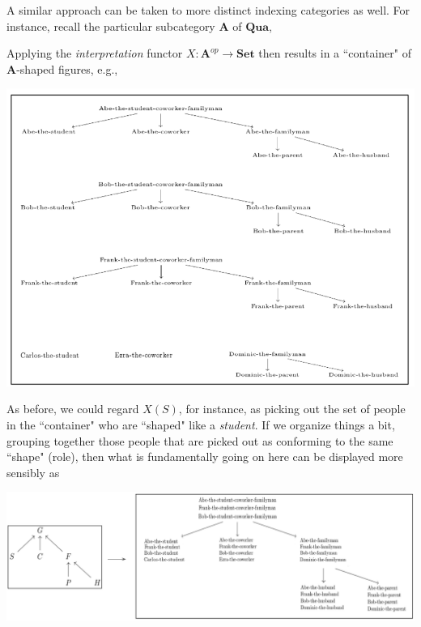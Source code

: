\documentclass[a4paper]{book}
\theoremstyle{definition}
\theoremstyle{definition}
\theoremstyle{definition}
\theoremstyle{theorem}
\theoremstyle{definition}
\begin{document}
A similar approach can be taken to more distinct indexing categories as well. For instance, recall the particular subcategory $\textbf{A}$ of $\textbf{Qua}$, 
	\begin{center}
\end{center}
Applying the \textit{interpretation} functor $X: \textbf{A}^{op} \rightarrow \textbf{Set}$ then results in a ``container" of $\textbf{A}$-shaped figures, e.g., 
\begin{center}
	\includegraphics*[scale=0.38]{LifePicture.png}
\end{center}
As before, we could regard $X(S)$, for instance, as picking out the set of people in the ``container" who are ``shaped" like a \textit{student}. If we organize things a bit, grouping together those people that are picked out as conforming to the same ``shape" (role), then what is fundamentally going on here can be displayed more sensibly as   
\begin{center}
	\includegraphics*[scale=0.28]{QuaPresheaf.png}
\end{center}
\end{document}
